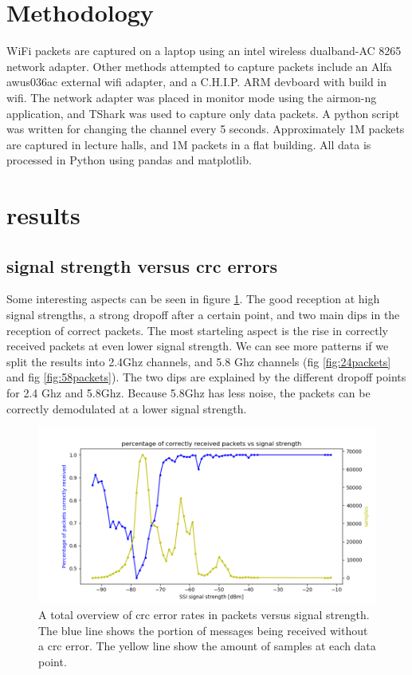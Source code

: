 \documentclass{IEEEtran}
\begin{document}
\section{Methodology}

WiFi packets are captured on a laptop using an intel wireless dualband-AC 8265 network adapter. Other methods attempted to capture packets include an Alfa awus036ac external wifi adapter, and a C.H.I.P. ARM devboard with build in wifi. The network adapter was placed in monitor mode using the airmon-ng application, and TShark was used to capture only data packets. A python script was written for changing the channel every 5 seconds. Approximately 1M packets are captured in lecture halls, and 1M packets in a flat building. All data is processed in Python using pandas and matplotlib.


\section{results}

\subsection{signal strength versus crc errors}

Some interesting aspects can be seen in figure \ref{fig:totalpackets}. The good reception at high signal strengths, a strong dropoff after a certain point, and two main dips in the reception of correct packets. The most starteling aspect is the rise in correctly received packets at even lower signal strength. We can see more patterns if we split the results into 2.4Ghz channels, and 5.8 Ghz channels (fig \ref{fig:24packets} and fig \ref{fig:58packets}). The two dips are explained by the different dropoff points for 2.4 Ghz and 5.8Ghz. Because 5.8Ghz has less noise, the packets can be correctly demodulated at a lower signal strength.

\begin{figure}[tb]
		\includegraphics[width=\textwidth]{figures/packets_total.png}
		\caption{A total overview of crc error rates in packets versus signal strength. The blue line shows the portion of messages being received without a crc error. The yellow line show the amount of samples at each data point. }
		\label{fig:totalpackets}
\end{figure}
\end{document}
